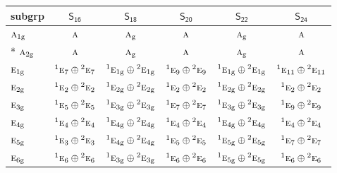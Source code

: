\documentclass[10pt,a4paper]{article}
\numberwithin{equation}{section}
\newcommand{\grp}[1]{\mathsf{#1}}
\newcommand{\irr}[1]{\text{\normalfont\scshape #1}}
\newcommand{\conjpair}[1]{{}^{#1}}
\newcommand{\ptag}[1]{\mathrm{#1}}
\begin{document}
{\small\begin{longtable}{@{}lccccc@{}}\toprule
subgrp & \href{S16.pdf}{$\grp{S_{16}}$} & \href{S18.pdf}{$\grp{S_{18}}$} & \href{S20.pdf}{$\grp{S_{20}}$} & \href{S22.pdf}{$\grp{S_{22}}$} & \href{S24.pdf}{$\grp{S_{24}}$}\\\midrule\endhead
\bottomrule\endfoot\endlastfoot
$\irr{a}_{1\ptag{g}}$ & $\irr{a}$ & $\irr{a}_{\ptag{g}}$ & $\irr{a}$ & $\irr{a}_{\ptag{g}}$ & $\irr{a}$\\*
$\irr{a}_{2\ptag{g}}$ & $\irr{a}$ & $\irr{a}_{\ptag{g}}$ & $\irr{a}$ & $\irr{a}_{\ptag{g}}$ & $\irr{a}$\\
$\irr{e}_{1\ptag{g}}$ & $\conjpair{1}\irr{e}_{7}\oplus \conjpair{2}\irr{e}_{7}$ & $\conjpair{1}\irr{e}_{1\ptag{g}}\oplus \conjpair{2}\irr{e}_{1\ptag{g}}$ & $\conjpair{1}\irr{e}_{9}\oplus \conjpair{2}\irr{e}_{9}$ & $\conjpair{1}\irr{e}_{1\ptag{g}}\oplus \conjpair{2}\irr{e}_{1\ptag{g}}$ & $\conjpair{1}\irr{e}_{11}\oplus \conjpair{2}\irr{e}_{11}$\\
$\irr{e}_{2\ptag{g}}$ & $\conjpair{1}\irr{e}_{2}\oplus \conjpair{2}\irr{e}_{2}$ & $\conjpair{1}\irr{e}_{2\ptag{g}}\oplus \conjpair{2}\irr{e}_{2\ptag{g}}$ & $\conjpair{1}\irr{e}_{2}\oplus \conjpair{2}\irr{e}_{2}$ & $\conjpair{1}\irr{e}_{2\ptag{g}}\oplus \conjpair{2}\irr{e}_{2\ptag{g}}$ & $\conjpair{1}\irr{e}_{2}\oplus \conjpair{2}\irr{e}_{2}$\\
$\irr{e}_{3\ptag{g}}$ & $\conjpair{1}\irr{e}_{5}\oplus \conjpair{2}\irr{e}_{5}$ & $\conjpair{1}\irr{e}_{3\ptag{g}}\oplus \conjpair{2}\irr{e}_{3\ptag{g}}$ & $\conjpair{1}\irr{e}_{7}\oplus \conjpair{2}\irr{e}_{7}$ & $\conjpair{1}\irr{e}_{3\ptag{g}}\oplus \conjpair{2}\irr{e}_{3\ptag{g}}$ & $\conjpair{1}\irr{e}_{9}\oplus \conjpair{2}\irr{e}_{9}$\\
$\irr{e}_{4\ptag{g}}$ & $\conjpair{1}\irr{e}_{4}\oplus \conjpair{2}\irr{e}_{4}$ & $\conjpair{1}\irr{e}_{4\ptag{g}}\oplus \conjpair{2}\irr{e}_{4\ptag{g}}$ & $\conjpair{1}\irr{e}_{4}\oplus \conjpair{2}\irr{e}_{4}$ & $\conjpair{1}\irr{e}_{4\ptag{g}}\oplus \conjpair{2}\irr{e}_{4\ptag{g}}$ & $\conjpair{1}\irr{e}_{4}\oplus \conjpair{2}\irr{e}_{4}$\\
$\irr{e}_{5\ptag{g}}$ & $\conjpair{1}\irr{e}_{3}\oplus \conjpair{2}\irr{e}_{3}$ & $\conjpair{1}\irr{e}_{4\ptag{g}}\oplus \conjpair{2}\irr{e}_{4\ptag{g}}$ & $\conjpair{1}\irr{e}_{5}\oplus \conjpair{2}\irr{e}_{5}$ & $\conjpair{1}\irr{e}_{5\ptag{g}}\oplus \conjpair{2}\irr{e}_{5\ptag{g}}$ & $\conjpair{1}\irr{e}_{7}\oplus \conjpair{2}\irr{e}_{7}$\\
$\irr{e}_{6\ptag{g}}$ & $\conjpair{1}\irr{e}_{6}\oplus \conjpair{2}\irr{e}_{6}$ & $\conjpair{1}\irr{e}_{3\ptag{g}}\oplus \conjpair{2}\irr{e}_{3\ptag{g}}$ & $\conjpair{1}\irr{e}_{6}\oplus \conjpair{2}\irr{e}_{6}$ & $\conjpair{1}\irr{e}_{5\ptag{g}}\oplus \conjpair{2}\irr{e}_{5\ptag{g}}$ & $\conjpair{1}\irr{e}_{6}\oplus \conjpair{2}\irr{e}_{6}$\\

\end{longtable}}
\end{document}
